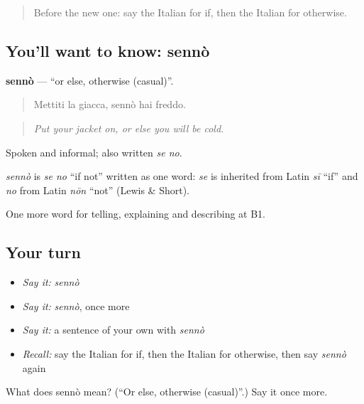 \begin{quote}
Before the new one: say the Italian for if, then the Italian for otherwise.
\end{quote}

\subsection*{You'll want to know: sennò}
\textbf{sennò} — \textquotedblleft{}or else, otherwise (casual)\textquotedblright{}.

\begin{quote}
Mettiti la giacca, sennò hai freddo.
\end{quote}

\begin{quote}
\emph{Put your jacket on, or else you will be cold.}
\end{quote}

Spoken and informal; also written \emph{se no}.

\begin{cousinweb}
\emph{sennò} is \emph{se no} \textquotedblleft{}if not\textquotedblright{} written as one word: \emph{se} is inherited from Latin \emph{sī} \textquotedblleft{}if\textquotedblright{} and \emph{no} from Latin \emph{nōn} \textquotedblleft{}not\textquotedblright{} (Lewis \& Short).
\end{cousinweb}

\begin{grammarlens}[title={What you've built}]
One more word for telling, explaining and describing at B1.
\end{grammarlens}

\subsection*{Your turn}
\begin{itemize}
\raggedright
  \item \emph{Say it:} \emph{sennò}
  \item \emph{Say it:} \emph{sennò}, once more
  \item \emph{Say it:} a sentence of your own with \emph{sennò}
  \item \emph{Recall:} say the Italian for if, then the Italian for otherwise, then say \emph{sennò} again
\end{itemize}

\begin{tcolorbox}[breakable,colback=teal!4,colframe=teal!35!black,title={Before you move on}]
What does sennò mean? (\textquotedblleft{}Or else, otherwise (casual)\textquotedblright{}.) Say it once more.
\end{tcolorbox}
